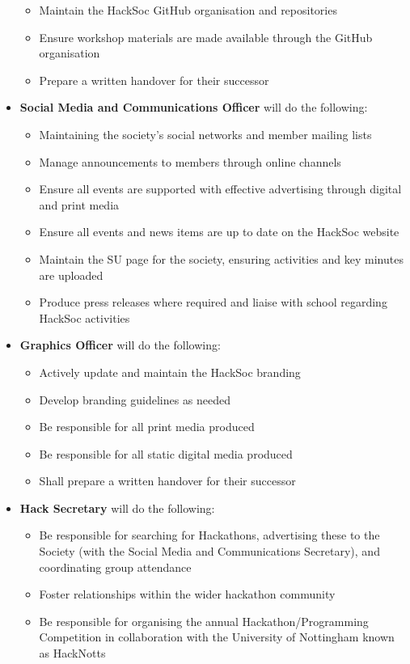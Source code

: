 \documentclass[a4paper,twoside,notitlepage,11pt]{article}
\begin{document}
\begin{itemize}
\begin{itemize}
	  \item Maintain the HackSoc GitHub organisation and repositories
	  \item Ensure workshop materials are made available through the GitHub organisation
	  \item Prepare a written handover for their successor
	\end{itemize}
	\item \textbf{Social Media and Communications Officer} will do the following:
	\begin{itemize}
	  \item Maintaining the society's social networks and member mailing lists
	  \item Manage announcements to members through online channels
	  \item Ensure all events are supported with effective advertising through digital and print media
	  \item Ensure all events and news items are up to date on the HackSoc website
	  \item Maintain the SU page for the society, ensuring activities and key minutes are uploaded
	  \item Produce press releases where required and liaise with school regarding HackSoc activities
	\end{itemize}
	\item \textbf{Graphics Officer} will do the following:
	\begin{itemize}
	  \item Actively update and maintain the HackSoc branding
	  \item Develop branding guidelines as needed
	  \item Be responsible for all print media produced
	  \item Be responsible for all static digital media produced
	  \item Shall prepare a written handover for their successor
	\end{itemize}
	\item \textbf{Hack Secretary} will do the following:
	\begin{itemize}
	  \item Be responsible for searching for Hackathons, advertising these to the Society (with the Social Media and Communications Secretary), and coordinating group attendance
	  \item Foster relationships within the wider hackathon community
	  \item Be responsible for organising the annual Hackathon/Programming Competition in collaboration with the University of Nottingham known as HackNotts

\end{itemize}
\end{itemize}
\end{document}
